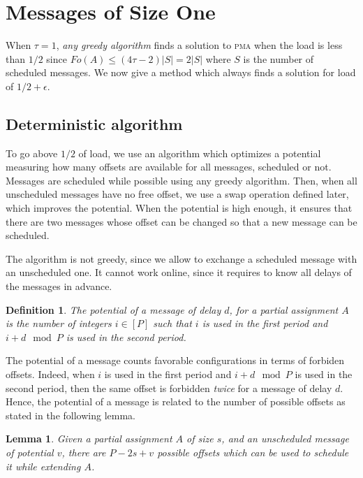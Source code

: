 \documentclass[10pt, conference, letterpaper]{IEEEtran}
\newtheorem{lemma}[theorem]{Lemma}
\newtheorem{definition}{Definition}
\newcommand\pma{\textsc{pma}\xspace}
\begin{document}
\section{Messages of Size One} \label{sec:small}

When $\tau = 1$, \emph{any greedy algorithm} finds a solution to \pma when the load is less than $1/2$ since $Fo(A) \leq (4\tau -2)|S| = 2|S|$ where $S$ is the number of scheduled messages. We now give a method which always finds a solution for load of $1/2 + \epsilon$.

\subsection{Deterministic algorithm}

To go above $1/2$ of load, we use an algorithm which optimizes a potential measuring how many offsets are available for all messages, scheduled or not. Messages are scheduled while possible using any greedy algorithm.
Then, when all unscheduled messages have no free offset, we use a swap operation defined later, which improves the potential. When the potential is high enough, it ensures that there are two messages whose offset can be changed so that a new message can be scheduled. 

 The algorithm is not greedy, since we allow to exchange a scheduled message with an unscheduled one. It cannot work online, since it requires to know all delays of the messages in advance. 

\begin{definition}
The potential of a message of delay $d$, for a partial assignment $A$
is the number of integers $i \in [P]$ such that $i$ is used in the first period and $i+d \mod P$ is used in the second period.
\end{definition}

The potential of a message counts favorable configurations in terms of forbiden offsets.
Indeed, when $i$ is used in the first period and $i+d \mod P$ is used in the second period,
then the same offset is forbidden \emph{twice} for a message of delay $d$. Hence, the potential of a message is related to the number of possible offsets as stated in the following lemma. 

\begin{lemma}
Given a partial assignment $A$ of size $s$, and an unscheduled message of potential 
$v$, there are $P - 2s + v$ possible offsets which can be used to schedule it while extending $A$.
\end{lemma}
\end{document}
